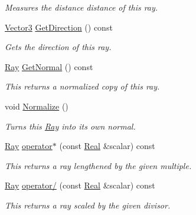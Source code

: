 \begin{DoxyCompactItemize}
\begin{DoxyCompactList}\small\item\em Measures the distance distance of this ray. \item\end{DoxyCompactList}\item 
\hyperlink{classphys_1_1Vector3}{Vector3} \hyperlink{classphys_1_1Ray_aaf40963b4e54e6d97dd05db41324eb7d}{GetDirection} () const 
\begin{DoxyCompactList}\small\item\em Gets the direction of this ray. \item\end{DoxyCompactList}\item 
\hyperlink{classphys_1_1Ray}{Ray} \hyperlink{classphys_1_1Ray_a7445c25acb6ce865ef85e7ada829ccba}{GetNormal} () const 
\begin{DoxyCompactList}\small\item\em This returns a normalized copy of this ray. \item\end{DoxyCompactList}\item 
void \hyperlink{classphys_1_1Ray_a2acbaef60718001a048db26ccaaef787}{Normalize} ()
\begin{DoxyCompactList}\small\item\em Turns this \hyperlink{classphys_1_1Ray}{Ray} into its own normal. \item\end{DoxyCompactList}\item 
\hyperlink{classphys_1_1Ray}{Ray} \hyperlink{classphys_1_1Ray_a6a47611776a9ab83d7ebc178a8d35b50}{operator$\ast$} (const \hyperlink{namespacephys_af7eb897198d265b8e868f45240230d5f}{Real} \&scalar) const 
\begin{DoxyCompactList}\small\item\em This returns a ray lengthened by the given multiple. \item\end{DoxyCompactList}\item 
\hyperlink{classphys_1_1Ray}{Ray} \hyperlink{classphys_1_1Ray_a126f8e4db94cccb5c0040db29c771a47}{operator/} (const \hyperlink{namespacephys_af7eb897198d265b8e868f45240230d5f}{Real} \&scalar) const 
\begin{DoxyCompactList}\small\item\em This returns a ray scaled by the given divisor. \item\end{DoxyCompactList}\item 

\end{DoxyCompactItemize}
